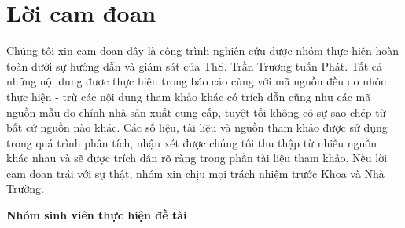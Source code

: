 \section*{Lời cam đoan}
\thispagestyle{empty}

\indent \indent Chúng tôi xin cam đoan đây là công trình nghiên cứu được nhóm thực hiện hoàn toàn dưới sự hướng dẫn và giám sát của ThS. Trần Trương tuấn Phát. Tất cả những nội dung được thực hiện trong báo cáo cùng với mã nguồn đều do nhóm thực hiện - trừ các nội dung tham khảo khác có trích dẫn cũng như các mã nguồn mẫu do chính nhà sản xuất cung cấp, tuyệt tối không có sự sao chép từ bất cứ nguồn nào khác. Các số liệu, tài liệu và nguồn tham khảo được sử dụng trong quá trình phân tích, nhận xét được chúng tôi thu thập từ nhiều nguồn khác nhau và sẽ được trích dẫn rõ ràng trong phần tài liệu tham khảo. Nếu lời cam đoan trái với sự thật, nhóm xin chịu mọi trách nhiệm trước Khoa và Nhà Trường.

\begin{flushright}
\textbf{Nhóm sinh viên thực hiện đề tài}
\end{flushright}
\clearpage
{}